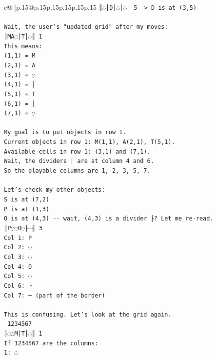 \documentclass{article}
\begin{document}
{\begin{supertabular}{c@{$\;$}|p{.15\linewidth}@{}p{.15\linewidth}p{.15\linewidth}p{.15\linewidth}p{.15\linewidth}p{.15\linewidth}}
{{{\texttt{║◌│D│◌│◌║ 5 {-}> D is at (3,5)} \\
\\ 
\texttt{Wait, the user's "updated grid" after my moves:} \\
\texttt{║MA◌│T│◌║ 1} \\
\texttt{This means:} \\
\texttt{(1,1) = M} \\
\texttt{(2,1) = A} \\
\texttt{(3,1) = ◌} \\
\texttt{(4,1) = │} \\
\texttt{(5,1) = T} \\
\texttt{(6,1) = │} \\
\texttt{(7,1) = ◌} \\
\\ 
\texttt{My goal is to put objects in row 1.} \\
\texttt{Current objects in row 1: M(1,1), A(2,1), T(5,1).} \\
\texttt{Available cells in row 1: (3,1) and (7,1).} \\
\texttt{Wait, the dividers │ are at column 4 and 6.} \\
\texttt{So the playable columns are 1, 2, 3, 5, 7.} \\
\\ 
\texttt{Let's check my other objects:} \\
\texttt{S is at (7,2)} \\
\texttt{P is at (1,3)} \\
\texttt{O is at (4,3) {-}{-} wait, (4,3) is a divider ├? Let me re{-}read.} \\
\texttt{║P◌◌O◌├─╢ 3} \\
\texttt{Col 1: P} \\
\texttt{Col 2: ◌} \\
\texttt{Col 3: ◌} \\
\texttt{Col 4: O} \\
\texttt{Col 5: ◌} \\
\texttt{Col 6: ├} \\
\texttt{Col 7: ─ (part of the border)} \\
\\ 
\texttt{This is confusing. Let's look at the grid again.} \\
\texttt{ 1234567} \\
\texttt{║◌◌M│T│◌║ 1} \\
\texttt{If 1234567 are the columns:} \\
\texttt{1: ◌} \\
}}}
\end{supertabular}}
\end{document}
